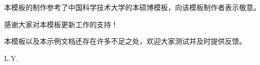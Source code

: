 ﻿
\begin{thanks}

本模板的制作参考了中国科学技术大学的本硕博模板，向该模板制作者表示敬意。

感谢大家对本模板更新工作的支持！

本模板以及本示例文档还存在许多不足之处，欢迎大家测试并及时提供反馈。

\begin{flushright}
L.Y.
\end{flushright}


\end{thanks}
